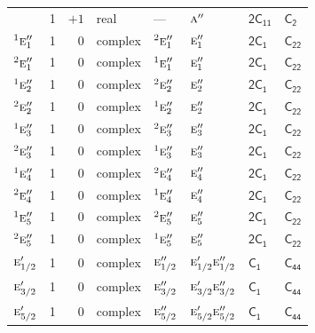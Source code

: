 \documentclass[10pt,a4paper]{article}
\makeatletter
\def\grouprule#1#2{\noalign{\marks\LTgroupmarks{\the\belowrulesep}\nobreak\vskip#1%
  \vskip\aboverulesep}\multispan\LT@cols\unskip{\leaders\hrule\@height#2\hfill\kern\z@}\cr
  \noalign{\penalty\LTrulebreak\vskip\belowrulesep\global\@lastruleclass\z@}}
\numberwithin{equation}{section}
\newcommand{\grp}[1]{\mathsf{#1}}
\newcommand{\irr}[1]{\text{\normalfont\scshape #1}}
\newcommand{\conjpair}[1]{{}^{#1}}
\newcommand{\detbox}[1]{{\setlength{\fboxsep}{1pt}\fbox{#1}}}
\makeatother
\begin{document}
{\begin{longtable}{@{}lrrlllll@{}}
\detbox{$\irr{a}''$} & 1 & $+1$ & real & --- & $\irr{a}''$ & \href{2C11.pdf}{$\grp{2C_{11}}$} & \href{../../../rotation/data/pdf/C2.pdf}{$\grp{C_{2}}$}\\
$\conjpair{1}\irr{e}_{1}''$ & 1 & $0$ & complex & $\conjpair{2}\irr{e}_{1}''$ & $\irr{e}_{1}''$ & \href{2C1.pdf}{$\grp{2C_{1}}$} & $\grp{C_{22}}$\\
$\conjpair{2}\irr{e}_{1}''$ & 1 & $0$ & complex & $\conjpair{1}\irr{e}_{1}''$ & $\irr{e}_{1}''$ & \href{2C1.pdf}{$\grp{2C_{1}}$} & $\grp{C_{22}}$\\
$\conjpair{1}\irr{e}_{2}''$ & 1 & $0$ & complex & $\conjpair{2}\irr{e}_{2}''$ & $\irr{e}_{2}''$ & \href{2C1.pdf}{$\grp{2C_{1}}$} & $\grp{C_{22}}$\\
$\conjpair{2}\irr{e}_{2}''$ & 1 & $0$ & complex & $\conjpair{1}\irr{e}_{2}''$ & $\irr{e}_{2}''$ & \href{2C1.pdf}{$\grp{2C_{1}}$} & $\grp{C_{22}}$\\
$\conjpair{1}\irr{e}_{3}''$ & 1 & $0$ & complex & $\conjpair{2}\irr{e}_{3}''$ & $\irr{e}_{3}''$ & \href{2C1.pdf}{$\grp{2C_{1}}$} & $\grp{C_{22}}$\\
$\conjpair{2}\irr{e}_{3}''$ & 1 & $0$ & complex & $\conjpair{1}\irr{e}_{3}''$ & $\irr{e}_{3}''$ & \href{2C1.pdf}{$\grp{2C_{1}}$} & $\grp{C_{22}}$\\
$\conjpair{1}\irr{e}_{4}''$ & 1 & $0$ & complex & $\conjpair{2}\irr{e}_{4}''$ & $\irr{e}_{4}''$ & \href{2C1.pdf}{$\grp{2C_{1}}$} & $\grp{C_{22}}$\\
$\conjpair{2}\irr{e}_{4}''$ & 1 & $0$ & complex & $\conjpair{1}\irr{e}_{4}''$ & $\irr{e}_{4}''$ & \href{2C1.pdf}{$\grp{2C_{1}}$} & $\grp{C_{22}}$\\
$\conjpair{1}\irr{e}_{5}''$ & 1 & $0$ & complex & $\conjpair{2}\irr{e}_{5}''$ & $\irr{e}_{5}''$ & \href{2C1.pdf}{$\grp{2C_{1}}$} & $\grp{C_{22}}$\\
$\conjpair{2}\irr{e}_{5}''$ & 1 & $0$ & complex & $\conjpair{1}\irr{e}_{5}''$ & $\irr{e}_{5}''$ & \href{2C1.pdf}{$\grp{2C_{1}}$} & $\grp{C_{22}}$\\
\grouprule{0pt}{\lightrulewidth}
$\irr{e}_{1/2}'$ & 1 & $0$ & complex & $\irr{e}_{1/2}''$ & $\irr{e}_{1/2}'\irr{e}_{1/2}''$ & \href{C1.pdf}{$\grp{C_{1}}$} & $\grp{C_{44}}$\\
$\irr{e}_{3/2}'$ & 1 & $0$ & complex & $\irr{e}_{3/2}''$ & $\irr{e}_{3/2}'\irr{e}_{3/2}''$ & \href{C1.pdf}{$\grp{C_{1}}$} & $\grp{C_{44}}$\\
$\irr{e}_{5/2}'$ & 1 & $0$ & complex & $\irr{e}_{5/2}''$ & $\irr{e}_{5/2}'\irr{e}_{5/2}''$ & \href{C1.pdf}{$\grp{C_{1}}$} & $\grp{C_{44}}$\\

\end{longtable}}
\end{document}
